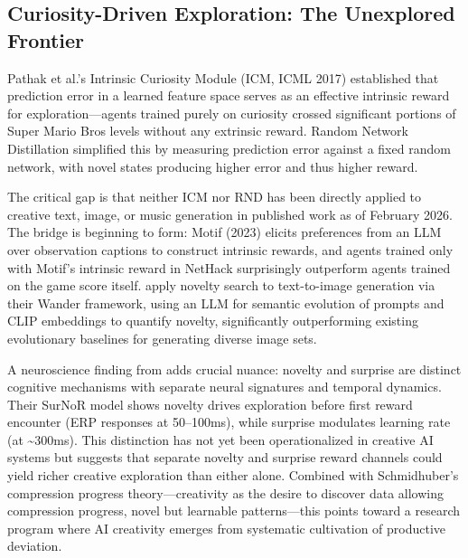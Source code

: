 \documentclass[12pt,a4paper]{article}
\begin{document}
\subsection{Curiosity-Driven Exploration: The Unexplored Frontier}
Pathak et al.'s Intrinsic Curiosity Module (ICM, ICML 2017) established that prediction error in a learned feature space serves as an effective intrinsic reward for exploration---agents trained purely on curiosity crossed significant portions of Super Mario Bros levels without any extrinsic reward. Random Network Distillation \citep{burda2019} simplified this by measuring prediction error against a fixed random network, with novel states producing higher error and thus higher reward.

The critical gap is that neither ICM nor RND has been directly applied to creative text, image, or music generation in published work as of February 2026. The bridge is beginning to form: Motif (2023) elicits preferences from an LLM over observation captions to construct intrinsic rewards, and agents trained only with Motif's intrinsic reward in NetHack surprisingly outperform agents trained on the game score itself. \citet{inch2025} apply novelty search to text-to-image generation via their Wander framework, using an LLM for semantic evolution of prompts and CLIP embeddings to quantify novelty, significantly outperforming existing evolutionary baselines for generating diverse image sets.

A neuroscience finding from \citet{xu2021} adds crucial nuance: novelty and surprise are distinct cognitive mechanisms with separate neural signatures and temporal dynamics. Their SurNoR model shows novelty drives exploration before first reward encounter (ERP responses at 50--100ms), while surprise modulates learning rate (at \textasciitilde{}300ms). This distinction has not yet been operationalized in creative AI systems but suggests that separate novelty and surprise reward channels could yield richer creative exploration than either alone. Combined with Schmidhuber's compression progress theory---creativity as the desire to discover data allowing compression progress, novel but learnable patterns---this points toward a research program where AI creativity emerges from systematic cultivation of productive deviation.
\end{document}
